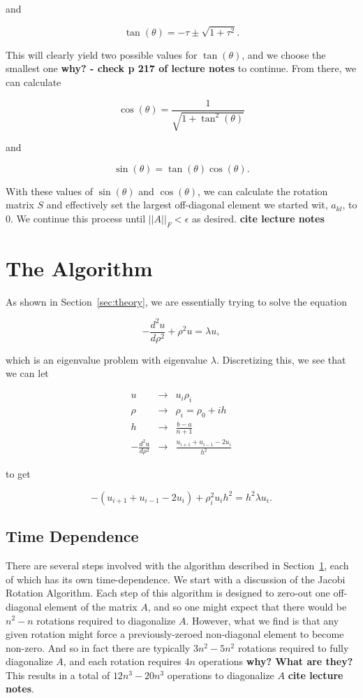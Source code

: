 \documentclass[12pt]{article}
\numberwithin{equation}{section}
\begin{document}
\noindent and 

$$\tan(\theta)=-\tau\pm\sqrt{1+\tau^2}.$$

\noindent This will clearly yield two possible values for $\tan(\theta)$, and we choose the smallest one \textbf{why? - check p 217 of lecture notes} to continue.  From there, we can calculate

$$\cos(\theta)=\frac{1}{\sqrt{1+\tan^{2}(\theta)}}$$

\noindent and

$$\sin(\theta)=\tan(\theta)\cos(\theta).$$

\noindent With these values of $\sin(\theta)$ and $\cos(\theta)$, we can calculate the rotation matrix $S$ and effectively set the largest off-diagonal element we started wit, $a_{kl}$, to 0.  We continue this process until $||A||_{F}<\epsilon$ as desired.  \textbf{cite lecture notes}

\section{The Algorithm}
\label{sec:algorithm}
As shown in Section~\ref{sec:theory}, we are essentially trying to solve the equation

$$-\frac{d^{2}u}{d\rho^{2}}+\rho^{2}u=\lambda u,$$

\noindent which is an eigenvalue problem with eigenvalue $\lambda$.  Discretizing this, we see that we can let

$$\begin{array}{ccc}
u & \rightarrow & u_{i}\rho_{i} \\
\rho & \rightarrow & \rho_{i}=\rho_{0}+ih \\
h & \rightarrow & \frac{b-a}{n+1} \\
-\frac{d^{2}u}{d\rho^{2}} & \rightarrow & \frac{u_{i+1}+u_{i-1}-2u_{i}}{h^{2}}
\end{array}$$

\noindent to get

\begin{equation}
\label{eq:alg1}
-\left(u_{i+1}+u_{i-1}-2u_{i}\right)+\rho_{i}^{2}u_{i}h^{2}=h^{2}\lambda u_{i}.
\end{equation}




\subsection{Time Dependence}
\label{subsec:timedependence}
There are several steps involved with the algorithm described in Section~\ref{sec:algorithm}, each of which has its own time-dependence.  We start with a discussion of the Jacobi Rotation Algorithm.  Each step of this algorithm is designed to zero-out one off-diagonal element of the matrix $A$, and so one might expect that there would be $n^{2}-n$ rotations required to diagonalize $A$.  However, what we find is that any given rotation might force a previously-zeroed non-diagonal element to become non-zero.  And so in fact there are typically $3n^{2}-5n^{2}$ rotations required to fully diagonalize $A$, and each rotation requires $4n$ operations \textbf{why?  What are they?}  This results in a total of $12n^{3}-20n^{3}$ operations to diagonalize $A$ \textbf{cite lecture notes}.
\end{document}
